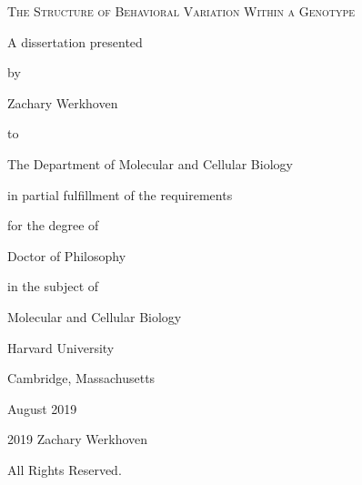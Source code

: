 \documentclass[12pt,letterpaper]{article}
\begin{document}


\vspace*{0.2in}
\thispagestyle{empty} 
\clearpage


\begin{titlepage}
	\centering
	\vspace{1cm}
	{\scshape \large The Structure of Behavioral Variation Within a Genotype\par}
	\vspace{1.0cm}
	A dissertation presented\par \vspace{0.35cm}
	by\par \vspace{0.35cm}
	Zachary Werkhoven\par \vspace{0.35cm}
	to\par \vspace{0.35cm}
	The Department of Molecular and Cellular Biology\par \vspace{0.35cm}
	in partial fulfillment of the requirements\par \vspace{0.35cm}
	for the degree of\par \vspace{0.35cm}
	Doctor of Philosophy\par \vspace{0.35cm}
	in the subject of\par \vspace{0.35cm}
	Molecular and Cellular Biology\par \vspace{0.35cm}
	\vfill
	Harvard University\par
	Cambridge, Massachusetts\par
	August 2019
	\vfill
\end{titlepage}
\clearpage

\vspace*{\fill}
    \begin{center}
    \textcopyright \hspace{0.01in} 2019 Zachary Werkhoven
    \end{center}
    \begin{center}
    All Rights Reserved.
    \end{center}
    \thispagestyle{empty}       %
\vspace*{\fill}
\clearpage
\end{document}
